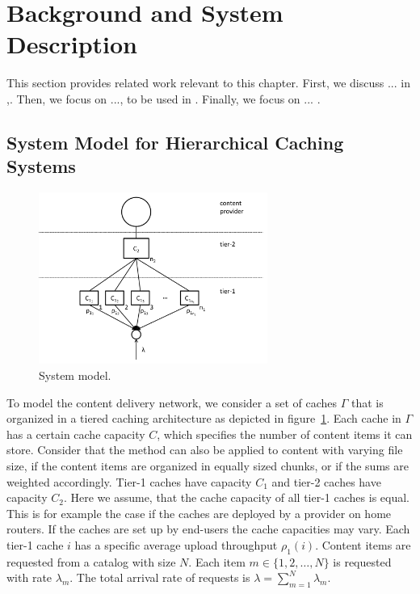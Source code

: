 \section{Background and System Description}\label{sec:hierarchical:related_work}
This section provides related work relevant to this chapter.
First, we discuss ... in ,.
Then, we focus on ..., to be used in .
Finally, we focus on ... .

\subsection{System Model for Hierarchical Caching Systems}

\begin{figure}[tb]
\centering
\includegraphics[width=75mm]{hierarchical/analyticbw/figures/hcmodeln1}
\caption{System model.}
\label{fig:hcmodel}
\end{figure}

To model the content delivery network, we consider a set of caches $\Gamma$ that is organized in a tiered caching architecture as depicted in figure~\ref{fig:hcmodel}. Each cache in $\Gamma$ has a certain cache capacity $C$, which specifies the number of content items it can store.
Consider that the method can also be applied to content with varying file size, if the content items are organized in equally sized chunks, or if the sums are weighted accordingly.
Tier-1 caches have capacity $C_1$ and tier-2 caches have capacity $C_2$.
Here we assume, that the cache capacity of all tier-1 caches is equal.
This is for example the case if the caches are deployed by a provider on home routers.
If the caches are set up by end-users the cache capacities may vary.
Each tier-1 cache $i$ has a specific average upload throughput $\rho_1(i)$.
Content items are requested from a catalog with size $N$.
Each item $m\in \{1,2,\dots,N\}$ is requested with rate $\lambda_m$.
The total arrival rate of requests is $\lambda=\sum_{m=1}^N \lambda_m$.

